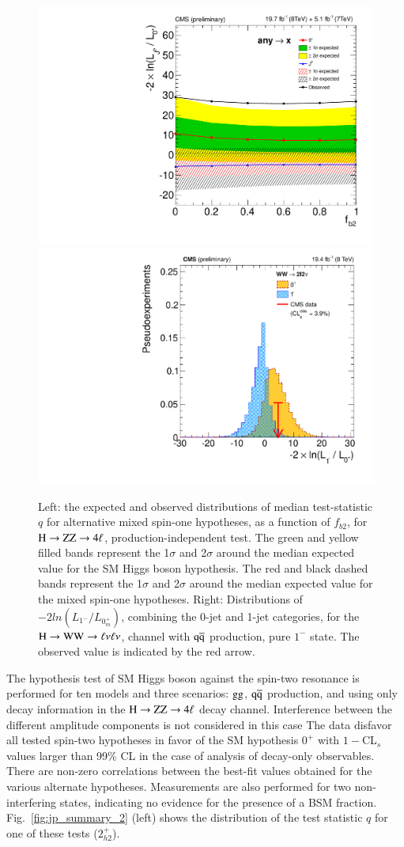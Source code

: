 \begin{figure}[!htbp]
  \begin{center}
\centerline{
\includegraphics[width=0.49\linewidth]{figures/hzz_spin1_summary_PI.pdf}
\includegraphics[width=0.52\linewidth]{figures/hzww_spin1_q1minus.pdf}
}
\caption{Left: the expected and observed distributions of median
  test-statistic $q$ for alternative mixed spin-one hypotheses, as
  a function of $f_{b2}$, for $\mathrm{H}\to\mathrm{Z}\mathrm{Z}\to4\ell$, production-independent
  test.  The green and yellow filled bands represent the 1$\sigma$
  and 2$\sigma$ around the median expected value for the SM Higgs
  boson hypothesis. The red and black dashed bands represent the
  1$\sigma$ and 2$\sigma$ around the median expected value for the
  mixed spin-one hypotheses.  Right: Distributions of $-2
  ln(L_{1^-} /L_{0^{+}_{m}})$, combining the 0-jet and 1-jet
  categories, for the $\mathrm{H}\to\mathrm{W}\mathrm{W}\to\ell\nu\ell\nu$, channel with $\mathrm{\mathrm{q}\mathrm{\overline{q}}}$
  production, pure $1^-$ state. The observed value is indicated by
  the red arrow.
  \label{fig:jp_summary_1}} 
  \end{center}
\end{figure}

The hypothesis test of SM Higgs boson against the spin-two resonance
is performed for ten models and three scenarios: $\mathrm{g}\mathrm{g}$, $\mathrm{\mathrm{q}\mathrm{\overline{q}}}$
production, and using only decay information in the $\mathrm{H}\to\mathrm{Z}\mathrm{Z}\to4\ell$ decay
channel. Interference between the different amplitude components is
not considered in this case The data disfavor all tested spin-two
hypotheses in favor of the SM hypothesis $0^+$ with $1-$CL$_s$ values
larger than 99\% CL in the case of analysis of decay-only observables.
There are non-zero correlations between the best-fit values obtained
for the various alternate hypotheses.  Measurements are also performed
for two non-interfering states, indicating no evidence for the
presence of a BSM fraction. Fig.~\ref{fig:jp_summary_2} (left) shows the
distribution of the test statistic $q$ for one of these tests
($2_{h2}^+$).

